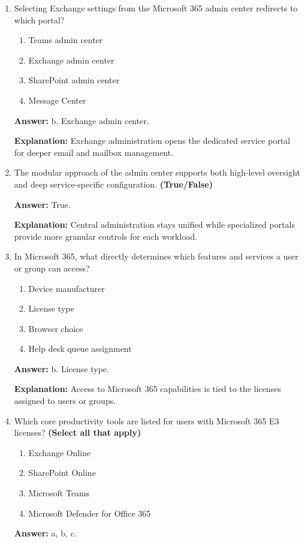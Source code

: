 \documentclass[10pt]{article}
\begin{document}
\begin{enumerate}[leftmargin=*]
\item Selecting Exchange settings from the Microsoft 365 admin center redirects to which portal?
\begin{enumerate}[label=\alph*., leftmargin=1.5em]
\item Teams admin center
\item Exchange admin center
\item SharePoint admin center
\item Message Center
\end{enumerate}
\textbf{Answer:} b. Exchange admin center.

\textbf{Explanation:} Exchange administration opens the dedicated service portal for deeper email and mailbox management.

\item The modular approach of the admin center supports both high-level oversight and deep service-specific configuration. \textbf{(True/False)}

\textbf{Answer:} True.

\textbf{Explanation:} Central administration stays unified while specialized portals provide more granular controls for each workload.

\item In Microsoft 365, what directly determines which features and services a user or group can access?
\begin{enumerate}[label=\alph*., leftmargin=1.5em]
\item Device manufacturer
\item License type
\item Browser choice
\item Help desk queue assignment
\end{enumerate}
\textbf{Answer:} b. License type.

\textbf{Explanation:} Access to Microsoft 365 capabilities is tied to the licenses assigned to users or groups.

\item Which core productivity tools are listed for users with Microsoft 365 E3 licenses? \textbf{(Select all that apply)}
\begin{enumerate}[label=\alph*., leftmargin=1.5em]
\item Exchange Online
\item SharePoint Online
\item Microsoft Teams
\item Microsoft Defender for Office 365
\end{enumerate}
\textbf{Answer:} a, b, c.


\end{enumerate}
\end{document}
